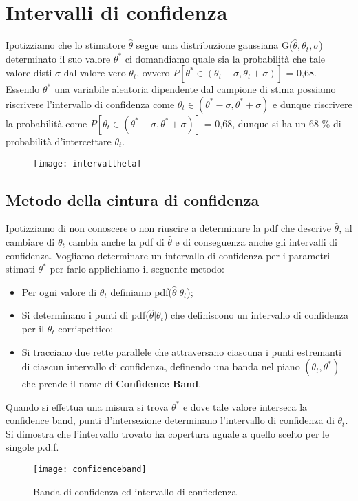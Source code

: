 \documentclass[11pt,a4paper]{book}
\begin{document}
\section{Intervalli di confidenza}

Ipotizziamo che lo stimatore $\hat{\theta}$ segue una distribuzione gaussiana G($\hat{\theta},\theta_t,\sigma$) determinato il suo valore $\theta^*$ ci domandiamo quale sia la probabilit\`{a} che tale valore disti $\sigma$ dal valore vero $\theta_t$, ovvero $P[\theta^* \in (\theta_t - \sigma, \theta_t + \sigma)]$ = 0,68. Essendo $\theta^*$ una variabile aleatoria dipendente dal campione di stima possiamo riscrivere l'intervallo di confidenza come $ \theta_t \in (\theta^* - \sigma,\theta^* + \sigma)$ e dunque riscrivere la probabilit\`{a} come $P[\theta_t \in (\theta^* - \sigma, \theta^* + \sigma)]$ = 0,68, dunque si ha un 68 \% di probabilit\`{a} d'intercettare $\theta_t$.
\begin{figure}[ht]
\vspace{0.1in}
\texttt{[image: intervaltheta]}	
\centering
\end{figure}

\subsection{Metodo della cintura di confidenza}

Ipotizziamo di non conoscere o non riuscire a determinare la pdf che descrive $\hat{\theta}$, al cambiare di $\theta_t$ cambia anche la pdf di $\hat{\theta}$ e di conseguenza anche gli intervalli di confidenza. Vogliamo determinare un intervallo di confidenza per i parametri stimati $\theta^*$ per farlo applichiamo il seguente metodo:

\begin{itemize}
	\item Per ogni valore di $\theta_t$ definiamo pdf($\hat{\theta} \vert \theta_t$);
	\item Si determinano i punti di pdf($\hat{\theta} \vert \theta_t$) che definiscono un intervallo di confidenza per il $\theta_t$ corrispettico;
	\item Si tracciano due rette parallele che attraversano ciascuna i punti estremanti di ciascun intervallo di confidenza, definendo una banda nel piano $(\theta_t,\theta^*)$ che prende il nome di \textbf{Confidence Band}.
\end{itemize}
Quando si effettua una misura si trova $\theta^*$ e dove tale valore interseca la confidence band, punti
d'intersezione determinano l'intervallo di confidenza di $\theta_t$. Si dimostra che l'intervallo trovato ha copertura uguale a quello scelto per le singole p.d.f.

 
\begin{figure}[ht]
\vspace{0.2in}
\texttt{[image: confidenceband]}	
\centering
\caption{Banda di confidenza ed intervallo di confiedenza}
\end{figure}
\end{document}
